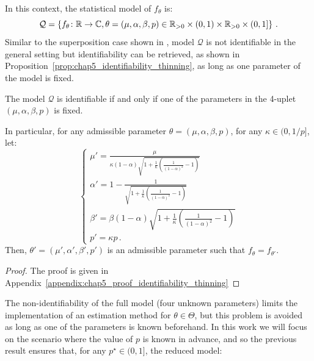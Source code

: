    In this context, the statistical model of $f_\theta$ is:
    \[\mathcal{Q} = 
      \left\{
        f_\theta \colon {\mathbb R} \to {\mathbb C}, 
        \theta = (\mu, \alpha, \beta, p) \in {\mathbb R}_{>0}\times (0,1) \times {\mathbb R}_{>0}\times(0,1]
      \right\}\,.
    \]
    Similar to the superposition case shown in \textcite[Proposition 3.2]{Bonnet2024}, 
    model $\mathcal{Q}$ is not identifiable in the general setting but identifiability can be retrieved, as shown in Proposition~\ref{prop:chap5_identifiability_thinning}, as long as one parameter of the model is fixed.

    \begin{proposition}\label{prop:chap5_identifiability_thinning}
        The model $\mathcal{Q}$ is identifiable if and only if one of the parameters in the 4-uplet $(\mu, \alpha, \beta, p)$ is fixed.

        In particular, for any admissible parameter $\theta = (\mu, \alpha, \beta, p)$,
        for any $\kappa\in(0, 1/p]$, let:
        \begin{equation}\label{eq:chap5_nonidentifiable_parameters}
        \begin{cases}
            \mu' = \frac{\mu}{\kappa(1-\alpha)\sqrt{1 + \frac{1}{\kappa}\left(\frac{1}{(1-\alpha)^2} - 1\right)}}\\
            \alpha' = 1 - \frac{1}{\sqrt{1 + \frac{1}{\kappa}\left(\frac{1}{(1-\alpha)^2} - 1\right)}}\\
            \beta' = \beta (1-\alpha) \sqrt{1 + \frac{1}{\kappa}\left(\frac{1}{(1-\alpha)^2} - 1\right)}\\
            p' = \kappa p\,.
          \end{cases}
        \end{equation}
          Then, $\theta' = (\mu', \alpha', \beta', p')$ is an admissible parameter such that $f_{\theta} = f_{\theta'}$.
    \end{proposition}

    \begin{proof}
        The proof is given in Appendix~\ref{appendix:chap5_proof_identifiability_thinning}
    \end{proof}

    The non-identifiability of the full model (four unknown parameters) limits the implementation of an estimation method for $\theta\in\Theta$, but this problem is avoided as long as one of the parameters is known beforehand. 
    In this work we will focus on the scenario where the value of $p$ is known in advance, 
    and so the previous result ensures that, for any $p^\star\in(0,1]$, the reduced model:
    
